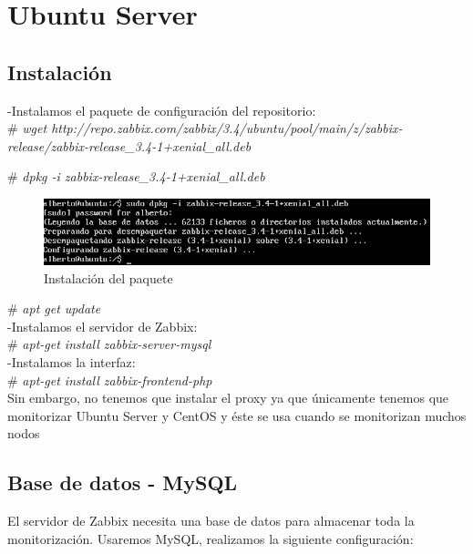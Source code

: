 \section{Ubuntu Server}

\subsection{Instalación}
-Instalamos el paquete de configuración del repositorio: \\
  \# \textit{wget  http://repo.zabbix.com/zabbix/3.4/ubuntu/pool/main/z/zabbix-release/zabbix-release\_3.4-1+xenial\_all.deb}
 
  \# \textit{dpkg -i  zabbix-release\_3.4-1+xenial\_all.deb} \\
  
   \begin{figure}[h]
   	\centering
   	\includegraphics[scale=0.5]{images/1.png}
   	\caption{Instalación del paquete}
   \end{figure}
  \# \textit{apt get  update} \\
  
 
-Instalamos el servidor de Zabbix: \\
\# \textit{apt-get install zabbix-server-mysql} \\

-Instalamos la interfaz:\\
\# \textit{apt-get install zabbix-frontend-php} \\

Sin embargo, no tenemos que instalar el proxy ya que únicamente tenemos que \\ monitorizar Ubuntu Server y CentOS y éste se usa cuando se monitorizan muchos nodos \\

\subsection{Base de datos - MySQL}

El servidor de Zabbix necesita una base de datos para almacenar toda la monitorización. Usaremos MySQL, realizamos la siguiente configuración: \\

